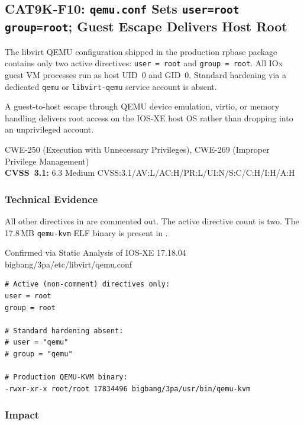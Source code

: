 \documentclass[11pt,a4paper]{article}
\begin{document}
\subsection{CAT9K-F10: \texorpdfstring{\texttt{qemu.conf}}{qemu.conf} Sets \texttt{user=root group=root}; Guest Escape Delivers Host Root}

\begin{overviewbox}
The libvirt QEMU configuration shipped in the production rpbase package contains only
two active directives: \texttt{user = root} and \texttt{group = root}. All IOx guest
VM processes run as host UID~0 and GID~0. Standard hardening via a dedicated
\texttt{qemu} or \texttt{libvirt-qemu} service account is absent.

A guest-to-host escape through QEMU device emulation, virtio, or memory handling
delivers root access on the IOS-XE host OS rather than dropping into an unprivileged
account.

CWE-250 (Execution with Unnecessary Privileges), CWE-269 (Improper Privilege Management)\\
\textbf{CVSS~3.1:} 6.3 Medium \quad CVSS:3.1/AV:L/AC:H/PR:L/UI:N/S:C/C:H/I:H/A:H
\end{overviewbox}

\subsubsection{Technical Evidence}

All other directives in  are commented out.
The active directive count is two. The 17.8\,MB \texttt{qemu-kvm} ELF binary is
present in .

\begin{pocbox}{Confirmed via Static Analysis of IOS-XE 17.18.04 bigbang/3pa/etc/libvirt/qemu.conf}
\begin{lstlisting}
# Active (non-comment) directives only:
user = root
group = root

# Standard hardening absent:
# user = "qemu"
# group = "qemu"

# Production QEMU-KVM binary:
-rwxr-xr-x root/root 17834496 bigbang/3pa/usr/bin/qemu-kvm
\end{lstlisting}
\end{pocbox}

\subsubsection{Impact}
\end{document}
